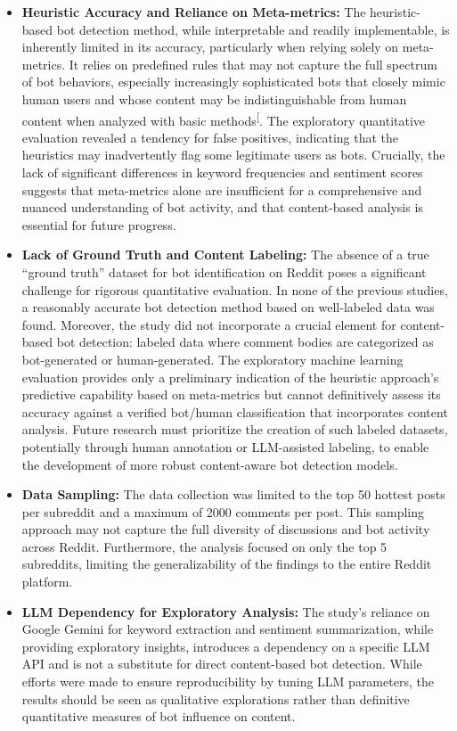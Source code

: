 \documentclass[
  12pt,
  letterpaper,
  DIV=11,
  numbers=noendperiod,
  abstract]{scrartcl}
\begin{document}
\begin{itemize}
\item
  \textbf{Heuristic Accuracy and Reliance on Meta-metrics:} The
  heuristic-based bot detection method, while interpretable and readily
  implementable, is inherently limited in its accuracy, particularly
  when relying solely on meta-metrics. It relies on predefined rules
  that may not capture the full spectrum of bot behaviors, especially
  increasingly sophisticated bots that closely mimic human users and
  whose content may be indistinguishable from human content when
  analyzed with basic
  methods\textsuperscript{{[}\citeproc{ref-botdetectionreddit}{1}{]}}.
  The exploratory quantitative evaluation revealed a tendency for false
  positives, indicating that the heuristics may inadvertently flag some
  legitimate users as bots. Crucially, the lack of significant
  differences in keyword frequencies and sentiment scores suggests that
  meta-metrics alone are insufficient for a comprehensive and nuanced
  understanding of bot activity, and that content-based analysis is
  essential for future progress.
\item
  \textbf{Lack of Ground Truth and Content Labeling:} The absence of a
  true ``ground truth'' dataset for bot identification on Reddit poses a
  significant challenge for rigorous quantitative evaluation. In none of
  the previous studies, a reasonably accurate bot detection method based
  on well-labeled data was found. Moreover, the study did not
  incorporate a crucial element for content-based bot detection: labeled
  data where comment bodies are categorized as bot-generated or
  human-generated. The exploratory machine learning evaluation provides
  only a preliminary indication of the heuristic approach's predictive
  capability based on meta-metrics but cannot definitively assess its
  accuracy against a verified bot/human classification that incorporates
  content analysis. Future research must prioritize the creation of such
  labeled datasets, potentially through human annotation or LLM-assisted
  labeling, to enable the development of more robust content-aware bot
  detection models.
\item
  \textbf{Data Sampling:} The data collection was limited to the top 50
  hottest posts per subreddit and a maximum of 2000 comments per post.
  This sampling approach may not capture the full diversity of
  discussions and bot activity across Reddit. Furthermore, the analysis
  focused on only the top 5 subreddits, limiting the generalizability of
  the findings to the entire Reddit platform.
\item
  \textbf{LLM Dependency for Exploratory Analysis:} The study's reliance
  on Google Gemini for keyword extraction and sentiment summarization,
  while providing exploratory insights, introduces a dependency on a
  specific LLM API and is not a substitute for direct content-based bot
  detection. While efforts were made to ensure reproducibility by tuning
  LLM parameters, the results should be seen as qualitative explorations
  rather than definitive quantitative measures of bot influence on
  content.
\end{itemize}
\end{document}
